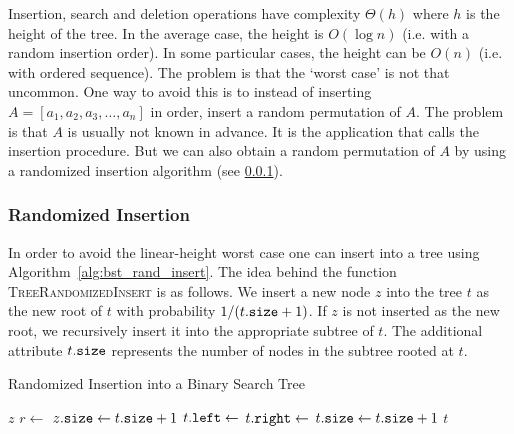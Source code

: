 \FloatBarrier

Insertion, search and deletion operations have complexity \(\Theta(h)\) where \(h\) is the height of the tree.
In the average case, the height is \(O(\log n)\) (i.e. with a random insertion order).
In some particular cases, the height can be \(O(n)\) (i.e. with ordered sequence).
The problem is that the `worst case' is not that uncommon.
One way to avoid this is to instead of inserting \(A = [a_1, a_2, a_3, \ldots, a_n]\) in order, insert a random permutation of \(A\).
The problem is that \(A\) is usually not known in advance.
It is the application that calls the insertion procedure.
But we can also obtain a random permutation of \(A\) by using a randomized insertion algorithm (see \ref{subsubsec:bst_rand_insert}).

\subsubsection{Randomized Insertion}
\label{subsubsec:bst_rand_insert}
In order to avoid the linear-height worst case one can insert into a tree using Algorithm~\ref{alg:bst_rand_insert}.
The idea behind the function \textsc{TreeRandomizedInsert} is as follows. 
We insert a new node \(z\) into the tree \(t\) as the new root of \(t\) with probability \(1/(t\mathtt{.}\mathtt{size}+1)\).
If \(z\) is not inserted as the new root, we recursively insert it into the appropriate subtree of \(t\).
The additional attribute \(t\mathtt{.}\mathtt{size}\) represents the number of nodes in the subtree rooted at \(t\).

\begin{algorithm}[htb]
  \caption{Randomized Insertion into a Binary Search Tree}
  \label{alg:bst_rand_insert}
  \begin{algorithmic}[1]
        \State \Return $z$
      \EndIf
      \State $r \gets$  
       
        \State $z\mathtt{.}\mathtt{size}\gets t\mathtt{.}\mathtt{size}+1$
        \State \Return {} 
      \EndIf
        \State $t\mathtt{.}\mathtt{left}\gets$ 
      \Else
        \State $t\mathtt{.}\mathtt{right}\gets$ 
      \EndIf
      \State $t\mathtt{.}\mathtt{size}\gets t\mathtt{.}\mathtt{size}+1$
      \State \Return $t$
    \EndFunction
  \end{algorithmic}
\end{algorithm}

